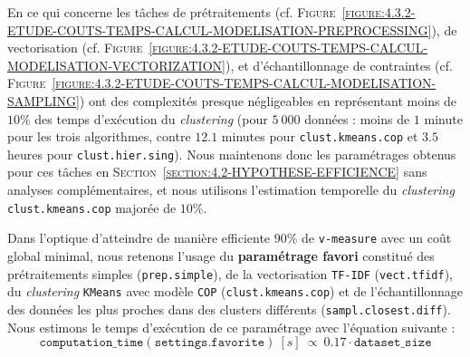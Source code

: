 			En ce qui concerne les tâches de prétraitements (cf. \textsc{Figure~\ref{figure:4.3.2-ETUDE-COUTS-TEMPS-CALCUL-MODELISATION-PREPROCESSING}}), de vectorisation (cf. \textsc{Figure~\ref{figure:4.3.2-ETUDE-COUTS-TEMPS-CALCUL-MODELISATION-VECTORIZATION}}), et d'échantillonnage de contraintes (cf. \textsc{Figure~\ref{figure:4.3.2-ETUDE-COUTS-TEMPS-CALCUL-MODELISATION-SAMPLING}}) ont des complexités presque négligeables en représentant moins de $10$\% des temps d'exécution du \textit{clustering} (pour $5~000$ données : moins de $1$ minute pour les trois algorithmes, contre $12.1$ minutes pour \texttt{clust.kmeans.cop} et $3.5$ heures pour \texttt{clust.hier.sing}).
			Nous maintenons donc les paramétrages obtenus pour ces tâches en \textsc{Section~\ref{section:4.2-HYPOTHESE-EFFICIENCE}} sans analyses complémentaires, et nous utilisons l'estimation temporelle du \textit{clustering} \texttt{clust.kmeans.cop} majorée de $10$\%.
			
			\setcounter{localCounterOfFootnoteValue}{\value{footnote}}
			\begin{leftBarSummary}
				Dans l'optique d'atteindre de manière efficiente $90$\% de \texttt{v-measure} \footnotemark avec un coût global minimal, nous retenons l'usage du \textbf{paramétrage favori} constitué des prétraitements simples (\texttt{prep.simple}), de la vectorisation \texttt{TF-IDF} (\texttt{vect.tfidf}), du \textit{clustering} \texttt{KMeans} avec modèle \texttt{COP} (\texttt{clust.kmeans.cop}) et de l'échantillonnage des données les plus proches dans des clusters différents (\texttt{sampl.closest.diff}).
				Nous estimons le temps d'exécution de ce paramétrage avec l'équation suivante \footnotemark :
				\begin{equation}
					\label{equation:4.3.2-ETUDE-COUTS-TEMPS-CALCUL-PARAMETRAGE-FAVORI}
					\texttt{computation\_time}(\texttt{settings.favorite})~[s]~
					\propto~0.17 \cdot \texttt{dataset\_size}
				\end{equation}
			\end{leftBarSummary}
				\footnotetext[\value{localCounterOfFootnoteValue}]{
					Temps du paramétrage favori : environ $2.8$ minutes pour $1~000$ données ; environ $14.2$ minutes pour $5~000$ données.
				}
	
